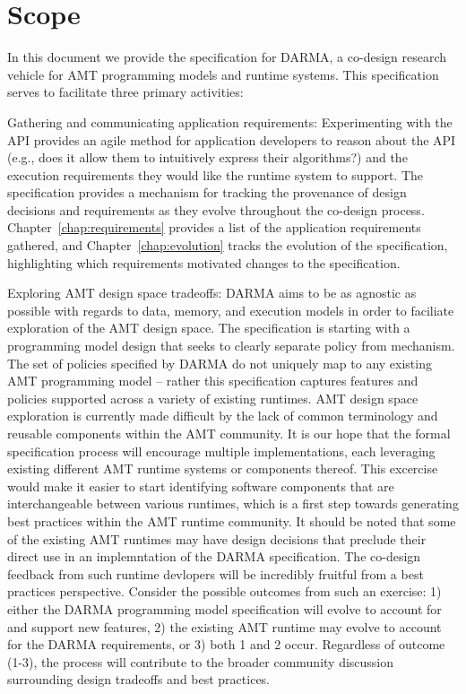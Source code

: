 \section{Scope}\label{sec:scope}
In this document we provide the specification for DARMA,
a co-design research vehicle for \gls{AMT} programming models and runtime
systems.  This specification serves to facilitate three primary activities: 
\begin{compactdesc}
\item[Gathering and communicating application requirements:]
Experimenting with the \gls{API} provides an agile method for application
developers to reason about the \gls{API} (e.g., does it allow them to intuitively
    express their algorithms?) and the execution requirements they would like
the runtime system to support.
The specification provides a mechanism for tracking the
provenance of design decisions and requirements as they evolve throughout the co-design
process. Chapter~\ref{chap:requirements} provides a list of the application
requirements gathered,  and
Chapter~\ref{chap:evolution} tracks the evolution of
the specification, highlighting which requirements
motivated changes to the specification.
\item[Exploring AMT design space tradeoffs:]
DARMA aims to be as agnostic as possible with regards to data, memory, and execution
models in order to faciliate exploration of the AMT design space. The specification is
starting with a programming model design that seeks to clearly separate policy
from mechanism.  The set of policies specified by DARMA do not uniquely map to any
existing AMT programming model -- rather this specification captures features and policies
supported across a variety of existing runtimes.
\gls{AMT} design space exploration is currently made difficult by the lack of
common terminology and reusable components within the \gls{AMT} community.  It
is our hope that the formal specification process will encourage multiple
implementations, each leveraging
existing different \gls{AMT} runtime systems or components thereof.  
This excercise would make it easier to start identifying 
software components that are interchangeable between various runtimes, which is a first
step towards generating best practices within the \gls{AMT} runtime community.
It should be noted that some of the existing \gls{AMT} runtimes 
may have design decisions that preclude their direct use in an implemntation of the
DARMA specification. The co-design feedback from such runtime devlopers 
will be incredibly fruitful from a best practices perspective. Consider 
the possible outcomes from such an exercise: 1) either the DARMA 
programming model specification will evolve to account for and support new
features, 2) the existing \gls{AMT} runtime may evolve to account for the DARMA
requirements, or 3) both 1 and 2 occur.  Regardless of outcome (1-3), the process will contribute to the
broader community discussion surrounding design tradeoffs and best practices. 


\end{compactdesc}

